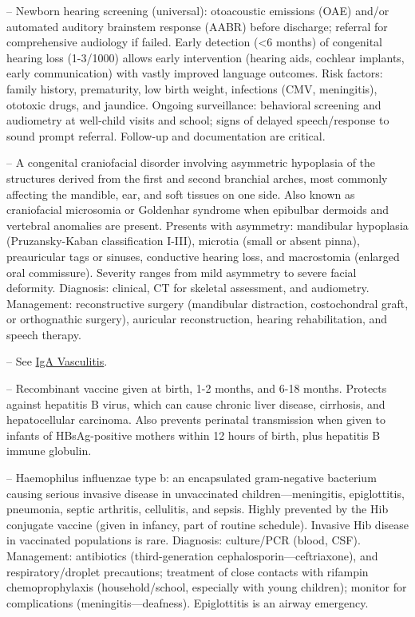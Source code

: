 -- Newborn hearing screening (universal): otoacoustic emissions (OAE) and/or automated auditory brainstem response (AABR) before discharge; referral for comprehensive audiology if failed. Early detection (<6 months) of congenital hearing loss (1-3/1000) allows early intervention (hearing aids, cochlear implants, early communication) with vastly improved language outcomes. Risk factors: family history, prematurity, low birth weight, infections (CMV, meningitis), ototoxic drugs, and jaundice. Ongoing surveillance: behavioral screening and audiometry at well-child visits and school; signs of delayed speech/response to sound prompt referral. Follow-up and documentation are critical.

-- A congenital craniofacial disorder involving asymmetric hypoplasia of the structures derived from the first and second branchial arches, most commonly affecting the mandible, ear, and soft tissues on one side. Also known as craniofacial microsomia or Goldenhar syndrome when epibulbar dermoids and vertebral anomalies are present. Presents with asymmetry: mandibular hypoplasia (Pruzansky-Kaban classification I-III), microtia (small or absent pinna), preauricular tags or sinuses, conductive hearing loss, and macrostomia (enlarged oral commissure). Severity ranges from mild asymmetry to severe facial deformity. Diagnosis: clinical, CT for skeletal assessment, and audiometry. Management: reconstructive surgery (mandibular distraction, costochondral graft, or orthognathic surgery), auricular reconstruction, hearing rehabilitation, and speech therapy.

-- See \hyperlink{IgA Vasculitis (Henoch-Schonlein Purpura)}{IgA Vasculitis}.

-- Recombinant vaccine given at birth, 1-2 months, and 6-18 months. Protects against hepatitis B virus, which can cause chronic liver disease, cirrhosis, and hepatocellular carcinoma. Also prevents perinatal transmission when given to infants of HBsAg-positive mothers within 12 hours of birth, plus hepatitis B immune globulin.

-- Haemophilus influenzae type b: an encapsulated gram-negative bacterium causing serious invasive disease in unvaccinated children—meningitis, epiglottitis, pneumonia, septic arthritis, cellulitis, and sepsis. Highly prevented by the Hib conjugate vaccine (given in infancy, part of routine schedule). Invasive Hib disease in vaccinated populations is rare. Diagnosis: culture/PCR (blood, CSF). Management: antibiotics (third-generation cephalosporin—ceftriaxone), and respiratory/droplet precautions; treatment of close contacts with rifampin chemoprophylaxis (household/school, especially with young children); monitor for complications (meningitis—deafness). Epiglottitis is an airway emergency.

